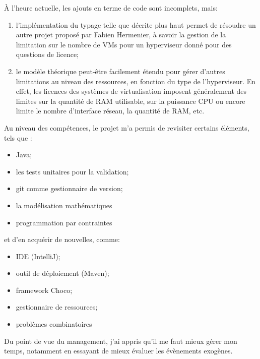 \documentclass[a4paper]{article}
\begin{document}
À l'heure actuelle, les ajouts en terme de code sont incomplets, mais:
\begin{enumerate}
	\item l'implémentation du typage telle que décrite plus haut
		permet de résoudre un autre projet proposé par Fabien
		Hermenier, à savoir la gestion de la limitation sur le nombre
		de VMs pour un hyperviseur donné pour des questions de
		licence;
	\item le modèle théorique peut-être facilement étendu pour gérer
		d'autres limitations au niveau des ressources, en fonction
		du type de l'hyperviseur. En effet, les licences des systèmes
		de virtualisation imposent généralement des limites sur la
		quantité de RAM utilisable, sur la puissance CPU ou encore
		limite le nombre d'interface réseau, la quantité de RAM, etc.
\end{enumerate}

Au niveau des compétences, le projet m'a permis de revisiter
certains éléments, tels que :
\begin{itemize}
	\item Java;
	\item les tests unitaires pour la validation;
	\item git comme gestionnaire de version;
	\item la modélisation mathématiques
	\item programmation par contraintes
\end{itemize}
et d'en acquérir de nouvelles, comme:
\begin{itemize}
	\item IDE (IntelliJ);
	\item outil de déploiement (Maven);
	\item framework Choco;
	\item gestionnaire de ressources;
	\item problèmes combinatoires
\end{itemize}

Du point de vue du management, j'ai appris qu'il me faut mieux gérer
mon temps, notamment en essayant de mieux évaluer les évènements exogènes.
\end{document}

